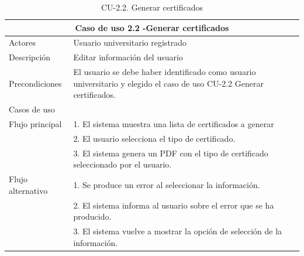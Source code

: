 \begin{table}[H]
    \caption{CU-2.2. Generar certificados}
    \label{tab:CU-2.2}
    \begin{center}
        \begin{tabular}{|l|p{12cm}|}
            \hline
            \multicolumn{2}{|c|}{Caso de uso 2.2 -Generar certificados} \\ \hline \hline
            Actores                 &   Usuario universitario registrado          \\  \hline
            Descripción             &   Editar información  del usuario \\  \hline
            Precondiciones          &   El usuario se debe haber identificado como usuario universitario y elegido el caso de uso CU-2.2 Generar certificados. \\
            \hline
            Casos de uso            &             \\  \hline
            Flujo principal         &   1. El sistema muestra una lista de certificados a generar   \\
            &   2. El usuario selecciona el tipo de certificado.    \\ 
            & 3. El sistema genera un PDF con el tipo de certificado seleccionado por el usuario. \\ \hline
            Flujo alternativo    &   1. Se produce un error al seleccionar la información. \\
            & 2. El sistema informa al usuario sobre el error que se ha producido. \\
            & 3. El sistema vuelve a mostrar la opción de selección de la información.
             \\  \hline
        \end{tabular}
    \end{center}
\end{table}


